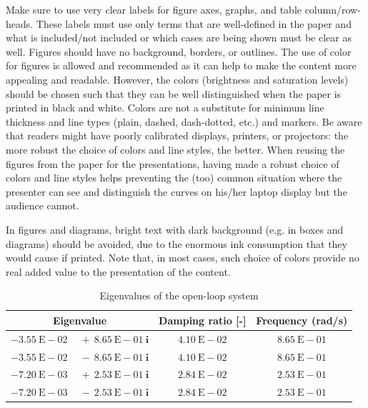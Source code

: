\documentclass{CEAS_EuroGNC_2024}
\begin{document}
Make sure to use very clear labels for figure axes, graphs, and table column/row-heads. These labels must use only terms that are well-defined in the paper and what is included/not included or which cases are being shown must be clear as well. Figures should have no background, borders, or outlines. The use of color for figures is allowed and recommended as it can help to make the content more appealing and readable. However, the colors (brightness and saturation levels) should be chosen such that they can be well distinguished when the paper is printed in black and white. Colors are not a substitute for minimum line thickness and line types (plain, dashed, dash-dotted, etc.) and markers. Be aware that readers might have poorly calibrated displays, printers, or projectors: the more robust the choice of colors and line styles, the better. When reusing the figures from the paper for the presentations, having made a robust choice of colors and line styles helps preventing the (too) common situation where the presenter can see and distinguish the curves on his/her laptop display but the audience cannot.

In figures and diagrams, bright text with dark background (e.g. in boxes and diagrams) should be avoided, due to the enormous ink consumption that they would cause if printed. Note that, in most cases, such choice of colors provide no real added value to the presentation of the content.




\newcommand{\ePowerTen}{\text{E}}
\newcommand{\iImag}{\bm{i}}
\begin{table}[!ht]	\centering
\caption{Eigenvalues of the open-loop system}\label{tab:modes_ol}
\begin{tabular}{|r@{}r|c|c|}\hline
   \multicolumn{2}{|c|}{Eigenvalue}                         &Damping ratio [-]       &Frequency (rad/s)   \\\hline
$-3.55\ \ePowerTen-02 \ \ $&$+\ \ 8.65\ \ePowerTen-01\  \iImag $&$4.10\ \ePowerTen-02$&$8.65\ \ePowerTen-01$\\      
$-3.55\ \ePowerTen-02 \ \ $&$-\ \ 8.65\ \ePowerTen-01\  \iImag $&$4.10\ \ePowerTen-02$&$8.65\ \ePowerTen-01$\\      
$-7.20\ \ePowerTen-03 \ \ $&$+\ \ 2.53\ \ePowerTen-01\  \iImag $&$2.84\ \ePowerTen-02$&$2.53\ \ePowerTen-01$\\      
$-7.20\ \ePowerTen-03 \ \ $&$-\ \ 2.53\ \ePowerTen-01\  \iImag $&$2.84\ \ePowerTen-02$&$2.53\ \ePowerTen-01$\\\hline
\end{tabular}
\end{table}
\end{document}
